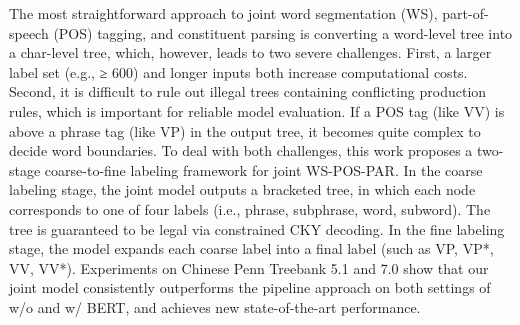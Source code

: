 The most straightforward approach to joint word segmentation (WS), part-of-speech (POS) tagging, and constituent parsing is converting a word-level tree into a char-level tree, which, however, leads to two severe challenges. First, a larger label set (e.g.,  ≥ 600) and longer inputs both increase computational costs. Second, it is difficult to rule out illegal trees containing conflicting production rules,  which is important for reliable model evaluation. If a POS tag (like VV) is above a phrase tag (like VP) in the output tree, it becomes quite complex to decide word boundaries. To deal with both challenges, this work proposes a two-stage coarse-to-fine labeling framework for joint WS-POS-PAR. In the coarse labeling stage, the joint model outputs a bracketed tree, in which each node corresponds to one of four labels (i.e., phrase, subphrase, word, subword). The tree is guaranteed to be legal via constrained CKY decoding. In the fine labeling stage, the model expands each coarse label into a final label (such as VP, VP*, VV, VV*). Experiments on Chinese Penn Treebank 5.1 and 7.0 show that our joint model consistently outperforms the pipeline approach on both settings of w/o and w/ BERT, and achieves new state-of-the-art performance.
